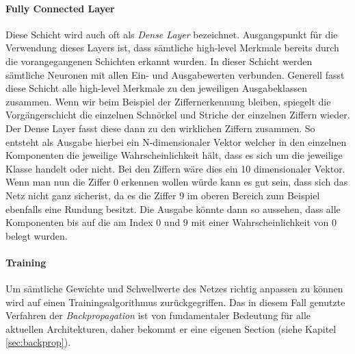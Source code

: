 \paragraph{Fully Connected Layer}
Diese Schicht wird auch oft als \emph{Dense Layer} bezeichnet. Ausgangspunkt für die Verwendung dieses Layers ist, dass sämtliche high-level Merkmale bereits durch die vorangegangenen Schichten erkannt wurden. In dieser Schicht werden sämtliche Neuronen mit allen Ein- und Ausgabewerten verbunden. Generell fasst diese Schicht alle high-level Merkmale zu den jeweiligen Ausgabeklassen zusammen. Wenn wir beim Beispiel der Ziffernerkennung bleiben, spiegelt die Vorgängerschicht die einzelnen Schnörkel und Striche der einzelnen Ziffern wieder. Der Dense Layer fasst diese dann zu den wirklichen Ziffern zusammen. So entsteht als Ausgabe hierbei ein N-dimensionaler Vektor welcher in den einzelnen Komponenten die jeweilige Wahrscheinlichkeit hält, dass es sich um die jeweilige Klasse handelt oder nicht. Bei den Ziffern wäre dies ein 10 dimensionaler Vektor. Wenn man nun die Ziffer 0 erkennen wollen würde kann es gut sein, dass sich das Netz \glqq nicht ganz sicher\grqq  ist, da es die Ziffer 9 im oberen Bereich zum Beispiel ebenfalls eine Rundung besitzt. Die Ausgabe könnte dann so aussehen, dass alle Komponenten bis auf die am Index 0 und 9 mit einer Wahrscheinlichkeit von 0 belegt wurden. 

\paragraph{Training} 
Um sämtliche Gewichte und Schwellwerte des Netzes richtig anpassen zu können wird auf einen Trainingsalgorithmus zurückgegriffen. Das in diesem Fall genutzte Verfahren der \emph{Backpropagation} ist von fundamentaler Bedeutung für alle aktuellen Architekturen, daher bekommt er eine eigenen Section (siehe Kapitel \ref{sec:backprop}). 
